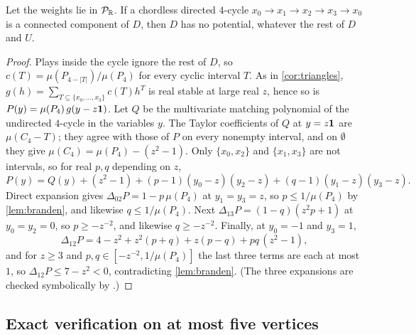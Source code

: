 \begin{corollary}\label{cor:c4}
Let the weights lie in $\mathcal{P}_{\mathbb{R}}$. If a chordless directed $4$-cycle $x_0\to x_1\to x_2\to x_3\to x_0$ is a connected component of $D$, then $D$ has no potential, whatever the rest of $D$ and $U$.
\end{corollary}
\begin{proof}
Plays inside the cycle ignore the rest of $D$, so $c(T)=\mu(P_{4-|T|})/\mu(P_4)$ for every cyclic interval $T$. As in \cref{cor:triangles}, $g(h)=\sum_{T\subseteq\{x_0,\dots,x_3\}}c(T)h^T$ is real stable at large real $z$, hence so is $P(y)=\mu(P_4)\,g(y-z\mathbf{1})$. Let $Q$ be the multivariate matching polynomial of the undirected $4$-cycle in the variables $y$. The Taylor coefficients of $Q$ at $y=z\mathbf{1}$ are $\mu(C_4-T)$; they agree with those of $P$ on every nonempty interval, and on $\emptyset$ they give $\mu(C_4)=\mu(P_4)-(z^2-1)$. Only $\{x_0,x_2\}$ and $\{x_1,x_3\}$ are not intervals, so for real $p,q$ depending on $z$,
\[
P(y)=Q(y)+(z^{2}-1)+(p-1)(y_0-z)(y_2-z)+(q-1)(y_1-z)(y_3-z).
\]
Direct expansion gives $\Delta_{02}P=1-p\,\mu(P_4)$ at $y_1=y_3=z$, so $p\le1/\mu(P_4)$ by \cref{lem:branden}, and likewise $q\le1/\mu(P_4)$. Next $\Delta_{13}P=(1-q)(z^{2}p+1)$ at $y_0=y_2=0$, so $p\ge-z^{-2}$, and likewise $q\ge-z^{-2}$. Finally, at $y_0=-1$ and $y_3=1$,
\[
\Delta_{12}P=4-z^{2}+z^{2}(p+q)+z(p-q)+pq\,(z^{2}-1),
\]
and for $z\ge3$ and $p,q\in[-z^{-2},1/\mu(P_4)]$ the last three terms are each at most $1$, so $\Delta_{12}P\le7-z^{2}<0$, contradicting \cref{lem:branden}. (The three expansions are checked symbolically by .)
\end{proof}

\subsection{Exact verification on at most five vertices}

